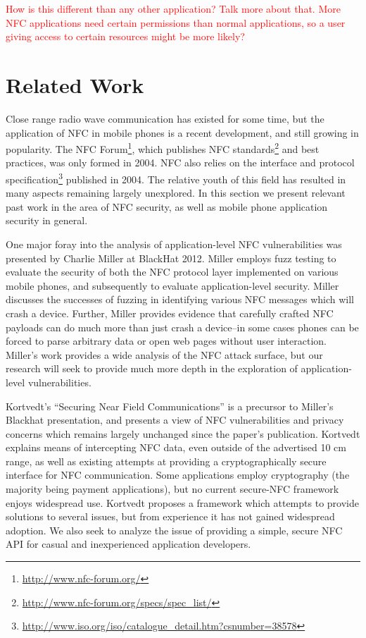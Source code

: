 \documentclass[12pt]{article}
\newcommand\TODO[1]{\textcolor{red}{#1}}
\begin{document}
\TODO{How is this different than any other application? Talk more about that. More NFC applications need certain permissions than normal applications, so a user giving access to certain resources might be more likely?}


\section{Related Work}
Close range radio wave communication has existed for some time, but the application of NFC in mobile phones is a recent development, and still growing in popularity.
The NFC Forum\footnote{\url{http://www.nfc-forum.org/}}, which publishes NFC standards\footnote{\url{http://www.nfc-forum.org/specs/spec_list/}} and best practices, was only formed in 2004.
NFC also relies on the interface and protocol specification\footnote{\url{http://www.iso.org/iso/catalogue_detail.htm?csnumber=38578}} published in 2004.
The relative youth of this field has resulted in many aspects remaining largely unexplored.
In this section we present relevant past work in the area of NFC security, as well as mobile phone application security in general.

One major foray into the analysis of application-level NFC vulnerabilities was presented by Charlie Miller at BlackHat 2012\cite{miller2012}.
Miller employs fuzz testing to evaluate the security of both the NFC protocol layer implemented on various mobile phones, and subsequently to evaluate application-level security.
Miller discusses the successes of fuzzing in identifying various NFC messages which will crash a device.
Further, Miller provides evidence that carefully crafted NFC payloads can do much more than just crash a device--in some cases phones can be forced to parse arbitrary data or open web pages without user interaction.
Miller's work provides a wide analysis of the NFC attack surface, but our research will seek to provide much more depth in the exploration of application-level vulnerabilities.

Kortvedt's ``Securing Near Field Communications''\cite{kortvedt2009} is a precursor to Miller's Blackhat presentation, and presents a view of NFC vulnerabilities and privacy concerns which remains largely unchanged since the paper's publication.
Kortvedt explains means of intercepting NFC data, even outside of the advertised 10 cm range, as well as existing attempts at providing a cryptographically secure interface for NFC communication.
Some applications employ cryptography (the majority being payment applications), but no current secure-NFC framework enjoys widespread use.
Kortvedt proposes a framework which attempts to provide solutions to several issues, but from experience it has not gained widespread adoption.
We also seek to analyze the issue of providing a simple, secure NFC API for casual and inexperienced application developers.
\end{document}
